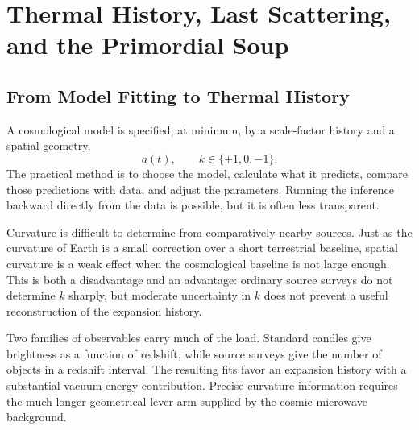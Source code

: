 \chapter{Thermal History, Last Scattering, and the Primordial Soup}


\section{From Model Fitting to Thermal History}

A cosmological model is specified, at minimum, by a scale-factor history and a spatial geometry,
\begin{equation}
a(t),
\qquad
k\in\{+1,0,-1\}.
\end{equation}
The practical method is to choose the model, calculate what it predicts, compare those predictions with data, and adjust the parameters. Running the inference backward directly from the data is possible, but it is often less transparent.

Curvature is difficult to determine from comparatively nearby sources. Just as the curvature of Earth is a small correction over a short terrestrial baseline, spatial curvature is a weak effect when the cosmological baseline is not large enough. This is both a disadvantage and an advantage: ordinary source surveys do not determine \(k\) sharply, but moderate uncertainty in \(k\) does not prevent a useful reconstruction of the expansion history.

Two families of observables carry much of the load. Standard candles give brightness as a function of redshift, while source surveys give the number of objects in a redshift interval. The resulting fits favor an expansion history with a substantial vacuum-energy contribution. Precise curvature information requires the much longer geometrical lever arm supplied by the cosmic microwave background.

